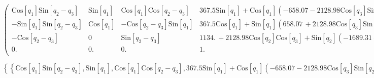 \documentclass{article}
\begin{document}
\begin{doublespace}
\noindent\(\left(
\begin{array}{cccc}
 \text{Cos}\left[q_1\right] \text{Sin}\left[q_2-q_3\right] & \text{Sin}\left[q_1\right] & \text{Cos}\left[q_1\right] \text{Cos}\left[q_2-q_3\right]
& 367.5 \text{Sin}\left[q_1\right]+\text{Cos}\left[q_1\right] \left(-658.07-2128.98 \text{Cos}\left[q_3\right] \text{Sin}\left[q_2\right]+\text{Cos}\left[q_2\right]
\left(-1689.31+2128.98 \text{Sin}\left[q_3\right]\right)\right) \\
 -\text{Sin}\left[q_1\right] \text{Sin}\left[q_2-q_3\right] & \text{Cos}\left[q_1\right] & -\text{Cos}\left[q_2-q_3\right] \text{Sin}\left[q_1\right]
& 367.5 \text{Cos}\left[q_1\right]+\text{Sin}\left[q_1\right] \left(658.07\, +2128.98 \text{Cos}\left[q_3\right] \text{Sin}\left[q_2\right]+\text{Cos}\left[q_2\right]
\left(1689.31\, -2128.98 \text{Sin}\left[q_3\right]\right)\right) \\
 -\text{Cos}\left[q_2-q_3\right] & 0 & \text{Sin}\left[q_2-q_3\right] & 1134.\, +2128.98 \text{Cos}\left[q_2\right] \text{Cos}\left[q_3\right]+\text{Sin}\left[q_2\right]
\left(-1689.31+2128.98 \text{Sin}\left[q_3\right]\right) \\
 0. & 0. & 0. & 1. \\
\end{array}
\right)\)
\end{doublespace}

\begin{doublespace}
\noindent\(\left\{\left\{\text{Cos}\left[q_1\right] \text{Sin}\left[q_2-q_3\right],\text{Sin}\left[q_1\right],\text{Cos}\left[q_1\right] \text{Cos}\left[q_2-q_3\right],367.5
\text{Sin}\left[q_1\right]+\text{Cos}\left[q_1\right] \left(-658.07-2128.98 \text{Cos}\left[q_3\right] \text{Sin}\left[q_2\right]+\text{Cos}\left[q_2\right]
\left(-1689.31+2128.98 \text{Sin}\left[q_3\right]\right)\right)\right\},\left\{-\text{Sin}\left[q_1\right] \text{Sin}\left[q_2-q_3\right],\text{Cos}\left[q_1\right],-\text{Cos}\left[q_2-q_3\right]
\text{Sin}\left[q_1\right],367.5 \text{Cos}\left[q_1\right]+\text{Sin}\left[q_1\right] \left(658.07\, +2128.98 \text{Cos}\left[q_3\right] \text{Sin}\left[q_2\right]+\text{Cos}\left[q_2\right]
\left(1689.31\, -2128.98 \text{Sin}\left[q_3\right]\right)\right)\right\},\left\{-\text{Cos}\left[q_2-q_3\right],0,\text{Sin}\left[q_2-q_3\right],1134.\,
+2128.98 \text{Cos}\left[q_2\right] \text{Cos}\left[q_3\right]+\text{Sin}\left[q_2\right] \left(-1689.31+2128.98 \text{Sin}\left[q_3\right]\right)\right\},\{0.,0.,0.,1.\}\right\}[1,4]\)
\end{doublespace}
\end{document}
